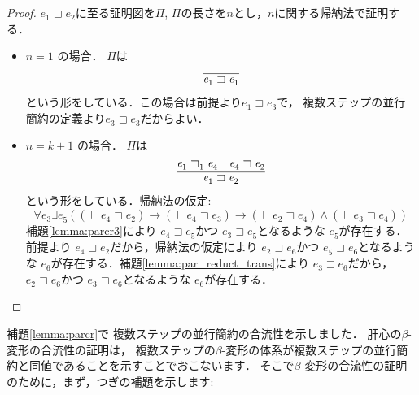 \documentclass{ltjsbook}%
\newcommand\lemmaname{補題}%
\begin{document}
\begin{proof}%
  $\mathit{e}_1^{}\sqsupset\mathit{e}_2^{}$に至る証明図を$\Pi$,%
  $\Pi$の長さを$n$とし，$n$に関する帰納法で証明する．%
  \begin{itemize}%
  \item $n = 1$ の場合．%
    $\Pi$は%
    \begin{equation}%
      \infer{%
        \mathit{e}_1^{}\sqsupset\mathit{e}_1^{}%
      }{%
      }%
    \end{equation}%
    という形をしている．この場合は前提より$\mathit{e}_1^{}\sqsupset\mathit{e}_3^{}$で，%
    複数ステップの並行簡約の定義より$\mathit{e}_3^{}\sqsupset\mathit{e}_3^{}$だからよい．%
  \item $n = k + 1$ の場合．%
    $\Pi$は%
    \begin{equation}%
      \infer{%
        \mathit{e}_1^{}\sqsupset\mathit{e}_2^{}%
      }{%
        \mathit{e}_1^{}\sqsupset_1^{}\mathit{e}_4^{}%
      &%
        \mathit{e}_4^{}\sqsupset\mathit{e}_2^{}%
      }%
    \end{equation}%
    という形をしている．帰納法の仮定:%
    \begin{equation}%
      \forall\mathit{e}_3^{}\exists\mathit{e}_5^{}%
      ((\vdash\mathit{e}_4^{}\sqsupset\mathit{e}_2^{})\rightarrow%
      (\vdash\mathit{e}_4^{}\sqsupset\mathit{e}_3^{})\rightarrow%
      (\vdash\mathit{e}_2^{}\sqsupset\mathit{e}_4^{})\land%
      (\vdash\mathit{e}_3^{}\sqsupset\mathit{e}_4^{}))%
    \end{equation}%
    \lemmaname\ref{lemma:parcr3}により%
    $\mathit{e}_4^{}\sqsupset\mathit{e}_5^{}$かつ%
    $\mathit{e}_3^{}\sqsupset\mathit{e}_5^{}$となるような%
    $\mathit{e}_5^{}$が存在する．前提より%
    $\mathit{e}_4^{}\sqsupset\mathit{e}_2^{}$だから，帰納法の仮定により%
    $\mathit{e}_2^{}\sqsupset\mathit{e}_6^{}$かつ%
    $\mathit{e}_5^{}\sqsupset\mathit{e}_6^{}$となるような%
    $\mathit{e}_6^{}$が存在する．\lemmaname\ref{lemma:par_reduct_trans}により%
    $\mathit{e}_3^{}\sqsupset\mathit{e}_6^{}$だから，%
    $\mathit{e}_2^{}\sqsupset\mathit{e}_6^{}$かつ%
    $\mathit{e}_3^{}\sqsupset\mathit{e}_6^{}$となるような%
    $\mathit{e}_6^{}$が存在する．%
  \end{itemize}%
\end{proof}%
\par\lemmaname\ref{lemma:parcr}で%
複数ステップの並行簡約の合流性を示しました．%
肝心の$\beta$-変形の合流性の証明は，%
複数ステップの$\beta$-変形の体系が複数ステップの並行簡約と同値であることを示すことでおこないます．%
そこで$\beta$-変形の合流性の証明のために，まず，つぎの補題を示します:%
\end{document}
